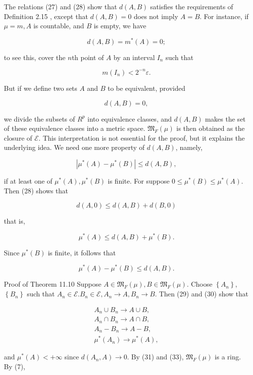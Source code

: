 \documentclass[10pt]{article}
\begin{document}
The relations (27) and (28) show that $d(A, B)$ satisfies the requirements of Definition 2.15 , except that $d(A, B)=0$ does not imply $A=B$. For instance, if $\mu=m, A$ is countable, and $B$ is empty, we have

$$
d(A, B)=m^{*}(A)=0 ;
$$

to see this, cover the $n$th point of $A$ by an interval $I_{n}$ such that

$$
m\left(I_{n}\right)<2^{-n} \varepsilon .
$$

But if we define two sets $A$ and $B$ to be equivalent, provided

$$
d(A, B)=0,
$$

we divide the subsets of $R^{p}$ into equivalence classes, and $d(A, B)$ makes the set of these equivalence classes into a metric space. $\mathfrak{M}_{F}(\mu)$ is then obtained as the closure of $\mathscr{E}$. This interpretation is not essential for the proof, but it explains the underlying idea. We need one more property of $d(A, B)$, namely,

$$
\left|\mu^{*}(A)-\mu^{*}(B)\right| \leq d(A, B),
$$

if at least one of $\mu^{*}(A), \mu^{*}(B)$ is finite. For suppose $0 \leq \mu^{*}(B) \leq \mu^{*}(A)$. Then (28) shows that

$$
d(A, 0) \leq d(A, B)+d(B, 0)
$$

that is,

$$
\mu^{*}(A) \leq d(A, B)+\mu^{*}(B) .
$$

Since $\mu^{*}(B)$ is finite, it follows that

$$
\mu^{*}(A)-\mu^{*}(B) \leq d(A, B) .
$$

Proof of Theorem 11.10 Suppose $A \in \mathfrak{M}_{F}(\mu), B \in \mathfrak{M}_{F}(\mu)$. Choose $\left\{A_{n}\right\}$, $\left\{B_{n}\right\}$ such that $A_{n} \in \mathscr{E} . B_{n} \in \mathscr{E}, A_{n} \rightarrow A, B_{n} \rightarrow B$. Then (29) and (30) show that

$$
\begin{gathered}
A_{n} \cup B_{n} \rightarrow A \cup B, \\
A_{n} \cap B_{n} \rightarrow A \cap B, \\
A_{n}-B_{n} \rightarrow A-B, \\
\mu^{*}\left(A_{n}\right) \rightarrow \mu^{*}(A),
\end{gathered}
$$

and $\mu^{*}(A)<+\infty$ since $d\left(A_{n}, A\right) \rightarrow 0$. By (31) and (33), $\mathfrak{M}_{F}(\mu)$ is a ring. By (7),
\end{document}
